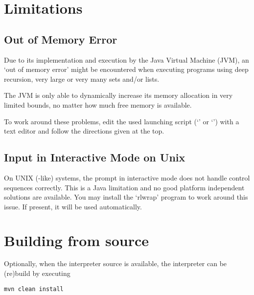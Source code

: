 \section{Limitations}

\subsection{Out of Memory Error}

Due to its implementation and execution by the Java Virtual Machine (JVM), an `out of memory error' might be encountered when executing \SetlX{} programs using deep recursion, very large or very many sets and\slash{}or lists.

The JVM is only able to dynamically increase its memory allocation in very limited bounds, no matter how much free memory is available.

To work around these problems, edit the used launching script (`' or `') with a text editor and follow the directions given at the top.

\subsection{Input in Interactive Mode on Unix}\label{LimitationsInteractiveMode}

On UNIX (-like) systems, the prompt in interactive mode does not handle control sequences correctly. This is a Java limitation and no good platform independent solutions are available. You may install the `rlwrap' program to work around this issue. If present, it will be used automatically.

%

\section{Building from source}

Optionally, when the interpreter source is available, the interpreter can be (re)build by executing

\begin{lstlisting}[frame=none,numbers=none]
mvn clean install
\end{lstlisting}

